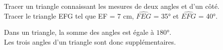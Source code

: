 \newpage

\begin{Méthode} {\footnotesize Tracer un triangle connaissant les mesures de deux angles et d'un côté.}\\
Tracer le triangle EFG tel que EF = 7 cm, $\widehat{FEG}$ = 35° et $\widehat{EFG}$ = 40°.

\vspace{4.5cm}

\end{Méthode}

\begin{Propriété}[c]
Dans un triangle, la somme des angles est égale à $180$°.\\
Les trois angles d'un triangle sont donc supplémentaires.
\end{Propriété}
 

